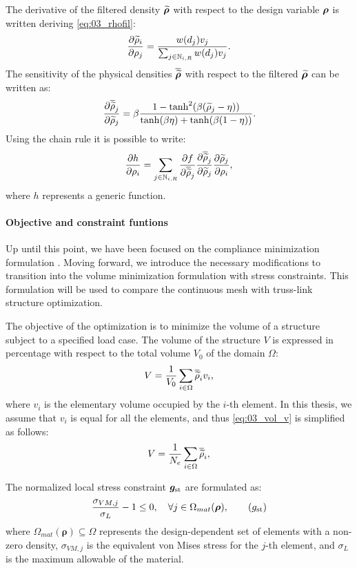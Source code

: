 The derivative of the filtered density $\bm{\widetilde{\rho}}$ with respect to the design variable $\bm{\rho}$ is written deriving \eqref{eq:03_rhofil}:
\begin{equation}
    \frac{\partial\widetilde{\rho}_i}{\partial\rho_j} = \frac{w(d_j)v_j}{\sum_{j \in \mathbb{N}_{i,R}} w(d_j)v_j}.
    \label{eq:03_sens_filt}
\end{equation}
The sensitivity of the physical densities $\bm{\overline{\widetilde{\rho}}}$ with respect to the filtered $\bm{\widetilde{\rho}}$ can be written as:
\begin{equation}
    \frac{\partial\overline{\widetilde{\rho}}_j}{\partial\widetilde{\rho}_j} = \beta \frac{1-\tanh^2(\beta(\widetilde{\rho}_j-\eta))}{\tanh(\beta\eta)+\tanh(\beta(1 - \eta))}.
    \label{eq:03_sens_proj}
\end{equation}
Using the chain rule it is possible to write:
\begin{equation}
    \label{eq:03_chain}
    \frac{\partial h}{\partial\rho_i} = \sum_{j \in \mathbb{N}_{i,R}} \frac{\partial f}{\partial\overline{\widetilde{\rho}}_j} \frac{\partial\overline{\widetilde{\rho}}_j}{\partial\widetilde{\rho}_j} \frac{\partial\widetilde{\rho}_j}{\partial\rho_i},
\end{equation}
where $h$ represents a generic function.
\paragraph{Objective and constraint funtions}
Up until this point, we have been focused on the compliance minimization formulation . Moving forward, we introduce the necessary modifications to transition into the volume minimization formulation with stress constraints. This formulation will be used to compare the continuous mesh with truss-link structure optimization.

The objective of the optimization is to minimize the volume of a structure subject to a specified load case. The volume of the structure $V$ is expressed in percentage with respect to the total volume $V_0$ of the domain $\Omega$:
\begin{equation}
    V = \frac{1}{V_0}\sum_{i \in \Omega} \overline{\widetilde{\rho}}_i v_i,
    \label{eq:03_vol_v}
\end{equation}
where $v_i$ is the elementary volume occupied by the $i$-th element. In this thesis, we assume that $v_i$ is equal for all the elements, and thus \eqref{eq:03_vol_v} is simplified as follows:
\begin{equation}
    V = \frac{1}{N_{e}} \sum_{i \in \Omega} \overline{\widetilde{\rho}}_i,  
    \label{eq:03_obj_vol}  
\end{equation}

The normalized local stress constraint $\bm{g}_{\text{st}}$ are formulated as:
\begin{equation}
    \frac{\sigma_{VM,j}}{\sigma_L}-1 \leq 0, \quad \forall j \in \Omega_{mat}(\bm{\rho}),
    \tag{$g_{\text{st}}$}
\end{equation}
where $\Omega_{mat}(\bm{\rho}) \subseteq \Omega$ represents the design-dependent set of elements with a non-zero density, $\sigma_{VM,j}$ is the equivalent von Mises stress for the $j$-th element, and $\sigma_L$ is the maximum allowable of the material.

